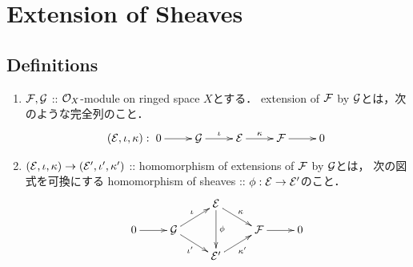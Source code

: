 \documentclass[a4paper]{jsarticle}
\begin{document}
\section{Extension of Sheaves}
    \subsection{Definitions}
    \begin{Def}
        \begin{enumerate}[label=(\roman*), leftmargin=*]
        \item
            $\mathcal{F}, \mathcal{G}$ :: $\mathcal{O}_X$-module on ringed space $X$とする．
            extension of $\mathcal{F}$ by $\mathcal{G}$とは，次のような完全列のこと．
            \[
            (\shE, \iota, \kappa):
                \xymatrix{
                    0 \ar[r]& \shG \ar[r]^-{\iota}& \shE \ar[r]^-{\kappa}& \shF \ar[r]& 0
            }\]

        \item
            $(\mathcal{E}, \iota, \kappa) \to (\mathcal{E}', \iota', \kappa')$
            :: homomorphism of extensions of $\mathcal{F}$ by $\mathcal{G}$とは，
            次の図式を可換にする
            homomorphism of sheaves :: $\phi: \mathcal{E} \to \mathcal{E}'$のこと．
            \[\xymatrix@R=10pt{
                    {}& {}& \shE \ar[dd]^-{\phi} \ar[rd]^-{\kappa}& {}& {} \\
                    0 \ar[r]& \shG \ar[ru]^-{\iota}\ar[rd]_-{\iota'}& {} & \shF \ar[r]& 0 \\
                    {}& {}& \shE' \ar[ru]_-{\kappa'}& {}& {}
            }\]
        

\end{enumerate}
\end{Def}
\end{document}
